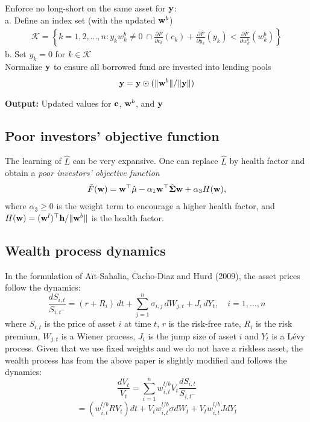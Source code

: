 \documentclass{article} %
\newcommand{\INDSTATE}[1][1]{\hspace{#1\algorithmicindent}}
\theoremstyle{plain}
\theoremstyle{definition} %
\begin{document}
\begin{algorithm}[th]
\begin{algorithmic}[1]
    \STATE Enforce no long-short on the same asset for ${\bf y}$:\\
    \INDSTATE a. Define an index set (with the updated ${\bf w}^b$)
    \begin{align*} 
      \mathcal{K} = \left\{
        k=1,2,...,n: y_k w^b_k\neq 0\ \cap 
      \frac{\partial \hat F}{\partial c_k}(c_k) + \frac{\partial \hat F}{\partial y_k}(y_k) < \frac{\partial \hat F}{\partial w^b_k}(w^b_k)
      \right\}
    \end{align*}
    \INDSTATE b. Set $y_k=0$ for $k \in \mathcal{K}$\\
    
    \STATE Normalize ${\bf y}$ to ensure all borrowed fund are invested into lending pools
     \begin{align*}{\bf y} = {\bf y} \odot (\|{\bf w}^b\|/ \|{\bf y}\|)\end{align*}
    
    \STATE \textbf{Output:} Updated values for ${\bf c}$, ${\bf w}^b$, and ${\bf y}$
    \end{algorithmic}
  \end{algorithm}


\subsection{Poor investors' objective function}
The learning of $\hat L$ can be very expansive. 
 One can replace $\hat L$ by health factor and obtain a \textit{poor investors' objective function}
 \begin{align}
  \tilde F({\bf w}) = {\bf w}^\top \hat {\bf \mu} - \alpha_1 {\bf w}^\top \hat {\bf \Sigma}{\bf w} + \alpha_3 H({\bf w}),
 \end{align}
 where $\alpha_3 \geq 0$ is the weight term to encourage a higher health factor, and $H({\bf w}) = ({\bf w}^l)^\top{\bf h}/\|{\bf w}^b\|$ is the health factor. 

 \subsection{Wealth process dynamics}
 In the formulation of Aït-Sahalia, Cacho-Diaz and Hurd (2009), the asset prices follow the dynamics:
 \[
\frac{dS_{i,t}}{S_{i,t^-}} = (r + R_i)\,dt + \sum_{j=1}^n \sigma_{i,j} \, dW_{j,t} + J_i \, dY_t, \quad i = 1, \dots, n
\]
where $S_{i,t}$ is the price of asset $i$ at time $t$, $r$ is the risk-free rate, $R_i$ is the risk premium, $W_{j,t}$ is a Wiener process, $J_i$ is the jump size of asset $i$ 
and $Y_t$ is a Lévy process.
Given that we use fixed weights and we do not have a riskless asset, the wealth process has from the above paper is slightly modified and follows the dynamics:
\[
\frac{dV_t}{V_t} = \sum_{i=1}^n w^{l/b}_{i,t} V_t \frac{dS_{i,t}}{S_{i,t^-}}
\]
\[
=(w^{l/b}_{i,t} R V_t)dt + V_t w^{l/b}_{i,t} \sigma dW_t + V_t w^{l/b}_{i,t} JdY_t
\]
\end{document}
